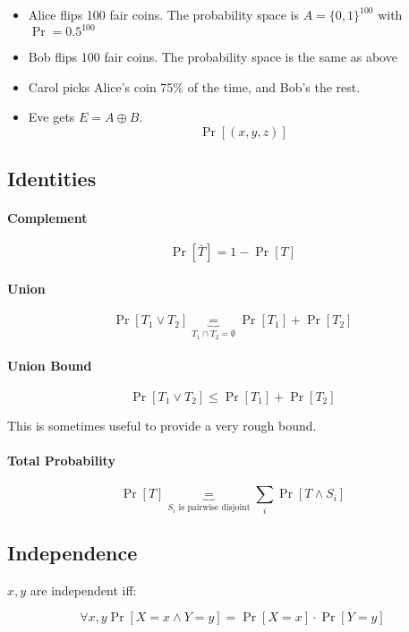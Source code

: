 \documentclass{idc_msc}
\DeclareMathOperator*{\xor}{\oplus}
\begin{document}
\begin{itemize}
  \item Alice flips 100 fair coins. The probability space is \(A = \{0,1\}^{100}\) with \(\Pr = 0.5^{100}\)
  \item Bob flips 100 fair coins. The probability space is the same as above
  \item Carol picks Alice's coin 75\% of the time, and Bob's the rest.
  \item Eve gets \(E = A \xor B\). 
  \[
  \Pr[(x,y,z)]
  \]
\end{itemize}

\subsection{Identities}

\paragraph{Complement}

\[\Pr[\bar{T}] = 1 - \Pr[T]\]

\paragraph{Union}

\[\Pr[T_1 \lor T_2] \underbrace{=}_{T_1 \cap T_2 = \emptyset} \Pr[T_1] + \Pr[T_2]\]

\paragraph{Union Bound}

\[
  \Pr[T_1 \lor T_2] \le \Pr[T_1] + \Pr[T_2]
\]

This is sometimes useful to provide a very rough bound.

\paragraph{Total Probability}

\[
  \Pr[T] \underbrace{=}_{S_i\text{ is pairwise disjoint}} \sum_i \Pr[T \land S_i]
\]

\subsection{Independence}

\(x, y\) are independent iff:

\[
  \forall x,y \Pr[X=x \land Y=y] = \Pr[X=x] \cdot \Pr[Y=y]
\]
\end{document}
